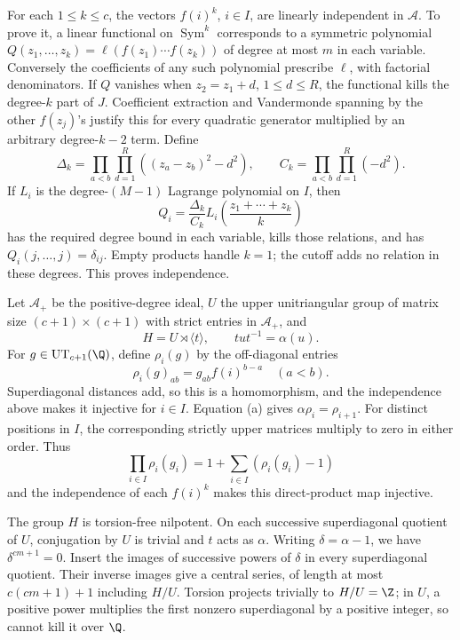 For each \(1\le k\le c\), the vectors \(f(i)^k\), \(i\in I\), are
linearly independent in \(\mathcal A\).
To prove it, a linear functional on \(\operatorname{Sym}^k\)
corresponds to a symmetric polynomial
\(Q(z_1,\ldots,z_k)=\ell(f(z_1)\cdots f(z_k))\) of degree at most
\(m\) in each variable. Conversely the coefficients of any such
polynomial prescribe \(\ell\), with factorial denominators.
If \(Q\) vanishes when \(z_2=z_1+d\), \(1\le d\le R\), the functional
kills the degree-\(k\) part of \(J\). Coefficient extraction and
Vandermonde spanning by the other \(f(z_j)\)'s justify this for every
quadratic generator multiplied by an arbitrary degree-\(k-2\) term.
Define
\[
 \Delta_k=\prod_{a<b}\prod_{d=1}^R((z_a-z_b)^2-d^2),\qquad
 C_k=\prod_{a<b}\prod_{d=1}^R(-d^2).
\]
If \(L_i\) is the degree-\((M-1)\) Lagrange polynomial on \(I\), then
\[
 Q_i=\frac{\Delta_k}{C_k}
 L_i\left(\frac{z_1+\cdots+z_k}{k}\right)
\]
has the required degree bound in each variable, kills those relations,
and has \(Q_i(j,\ldots,j)=\delta_{ij}\).
Empty products handle \(k=1\); the cutoff adds no relation in these
degrees. This proves independence.

Let \(\mathcal A_+\) be the positive-degree ideal, \(U\) the
upper unitriangular group of matrix size \((c+1)\times(c+1)\) with strict
entries in \(\mathcal A_+\), and
\[
 H=U\rtimes\langle t\rangle,\qquad tut^{-1}=\alpha(u).
\]
For \(g\in\mathrm{UT}_{c+1}(\Q)\), define \(\rho_i(g)\) by the
off-diagonal entries
\[
 \rho_i(g)_{ab}=g_{ab}f(i)^{b-a}\quad(a<b).
\]
Superdiagonal distances add, so this is a homomorphism, and the
independence above makes it injective for \(i\in I\).
Equation (a) gives \(\alpha\rho_i=\rho_{i+1}\).
For distinct positions in \(I\), the corresponding strictly upper
matrices multiply to zero in either order. Thus
\[
 \prod_{i\in I}\rho_i(g_i)=1+\sum_{i\in I}(\rho_i(g_i)-1)
\]
and the independence of each \(f(i)^k\) makes this direct-product map
injective.

The group \(H\) is torsion-free nilpotent.
On each successive superdiagonal quotient of \(U\), conjugation by
\(U\) is trivial and \(t\) acts as \(\alpha\).
Writing \(\delta=\alpha-1\), we have \(\delta^{cm+1}=0\).
Insert the images of successive powers of \(\delta\) in every
superdiagonal quotient. Their inverse images give a central series,
of length at most \(c(cm+1)+1\) including \(H/U\).
Torsion projects trivially to \(H/U=\Z\); in \(U\), a positive
power multiplies the first nonzero superdiagonal by a positive integer,
so cannot kill it over \(\Q\).

